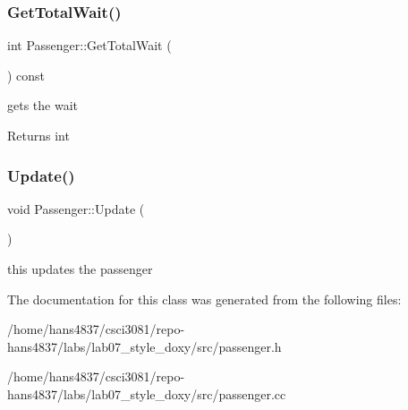 \subsubsection{\texorpdfstring{Get\+Total\+Wait()}{GetTotalWait()}}
{\footnotesize\ttfamily int Passenger\+::\+Get\+Total\+Wait (\begin{DoxyParamCaption}{ }\end{DoxyParamCaption}) const}



gets the wait 

\begin{DoxyReturn}{Returns}
int 
\end{DoxyReturn}
\mbox{\label{classPassenger_a960de3b29fc17a2c2d79c0b79d5cf299}} 
\subsubsection{\texorpdfstring{Update()}{Update()}}
{\footnotesize\ttfamily void Passenger\+::\+Update (\begin{DoxyParamCaption}{ }\end{DoxyParamCaption})}

this updates the passenger 

The documentation for this class was generated from the following files\+:\begin{DoxyCompactItemize}
\item 
/home/hans4837/csci3081/repo-\/hans4837/labs/lab07\+\_\+style\+\_\+doxy/src/passenger.\+h\item 
/home/hans4837/csci3081/repo-\/hans4837/labs/lab07\+\_\+style\+\_\+doxy/src/passenger.\+cc\end{DoxyCompactItemize}
